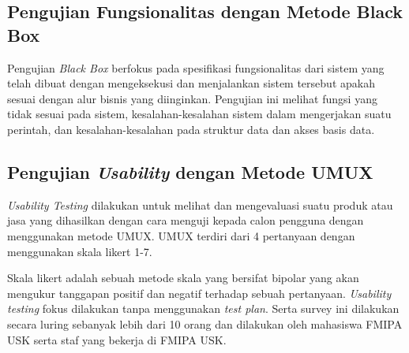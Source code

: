\subsection{Pengujian Fungsionalitas dengan Metode Black Box}
\par Pengujian \textit{Black Box} berfokus pada spesifikasi fungsionalitas dari sistem yang telah dibuat dengan mengeksekusi dan menjalankan sistem tersebut apakah sesuai dengan alur bisnis yang diinginkan. Pengujian ini melihat fungsi yang tidak sesuai pada sistem, kesalahan-kesalahan sistem dalam mengerjakan suatu perintah, dan kesalahan-kesalahan pada struktur data dan akses basis data.

\subsection{Pengujian \textit{Usability} dengan Metode UMUX}
\par \textit{Usability Testing} dilakukan untuk melihat dan mengevaluasi suatu produk atau jasa yang dihasilkan dengan cara menguji kepada calon pengguna dengan menggunakan metode UMUX. UMUX terdiri dari 4 pertanyaan dengan menggunakan skala likert 1-7.
\par Skala likert adalah sebuah metode skala yang bersifat bipolar yang akan mengukur tanggapan positif dan negatif terhadap sebuah pertanyaan. \textit{Usability testing} fokus dilakukan tanpa menggunakan \textit{test plan}. Serta survey ini dilakukan secara luring sebanyak lebih dari 10 orang dan dilakukan oleh mahasiswa FMIPA USK serta staf yang bekerja di FMIPA USK.




